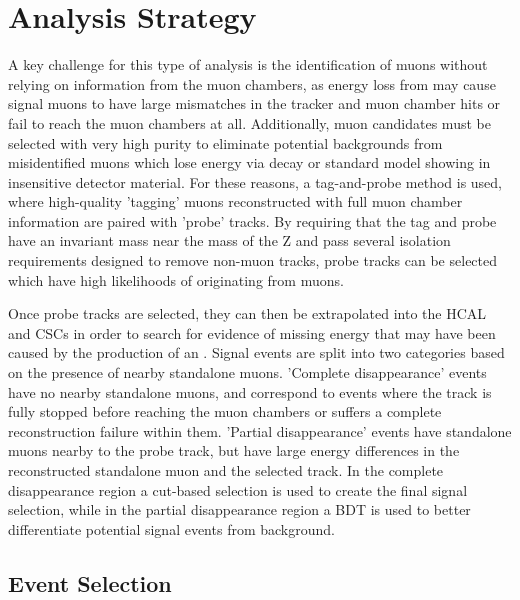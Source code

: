 \chapter{Analysis Strategy}
\label{analysis}
A key challenge for this type of analysis is the identification of muons without relying on information from the muon chambers, as energy loss from \dbrem may cause signal muons to have large mismatches in the tracker and muon chamber hits or fail to reach the muon chambers at all.
Additionally, muon candidates must be selected with very high purity to eliminate potential backgrounds from misidentified muons which lose energy via decay or standard model showing in insensitive detector material.
For these reasons, a tag-and-probe method is used, where high-quality 'tagging' muons reconstructed with full muon chamber information are paired with 'probe' tracks.
By requiring that the tag and probe have an invariant mass near the mass of the Z and pass several isolation requirements designed to remove non-muon tracks, probe tracks can be selected which have high likelihoods of originating from muons.

Once probe tracks are selected, they can then be extrapolated into the HCAL and CSCs in order to search for evidence of missing energy that may have been caused by the production of an \aprime.
Signal events are split into two categories based on the presence of nearby standalone muons.
'Complete disappearance' events have no nearby standalone muons, and correspond to events where the track is fully stopped before reaching the muon chambers or suffers a complete reconstruction failure within them.
'Partial disappearance' events have standalone muons nearby to the probe track, but have large energy differences in the reconstructed standalone muon and the selected track.
In the complete disappearance region a cut-based selection is used to create the final signal selection, while in the partial disappearance region a BDT is used to better differentiate potential signal events from background.

\section{Event Selection}
